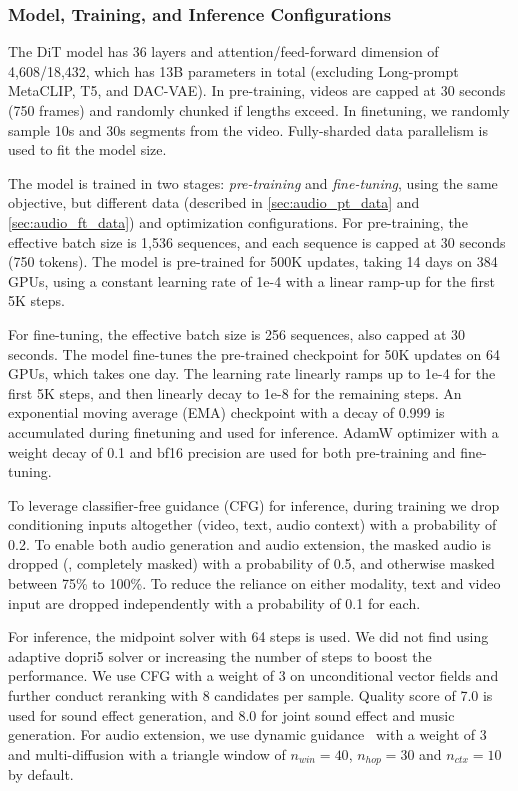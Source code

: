 \subsubsection{Model, Training, and Inference Configurations}
The DiT model has 36 layers and attention/feed-forward dimension of 4,608/18,432,
which has 13B parameters in total (excluding Long-prompt MetaCLIP, T5, and DAC-VAE).
In pre-training, videos are capped at 30 seconds (750 frames) and randomly chunked if lengths exceed.
In finetuning, we randomly sample 10s and 30s segments from the video.
Fully-sharded data parallelism is used to fit the model size.

The model is trained in two stages: \textit{pre-training} and \textit{fine-tuning}, using the same objective, but different data (described in \cref{sec:audio_pt_data} and \cref{sec:audio_ft_data}) and optimization configurations.
For pre-training, the effective batch size is 1,536 sequences, and each sequence is capped at 30 seconds (750 tokens).
The model is pre-trained for 500K updates, taking 14 days on 384 GPUs, using a constant learning rate of 1e-4 with a linear ramp-up for the first 5K steps.

For fine-tuning, the effective batch size is 256 sequences, also capped at 30 seconds.
The model fine-tunes the pre-trained checkpoint for 50K updates on 64 GPUs, which takes one day.
The learning rate linearly ramps up to 1e-4 for the first 5K steps, and then linearly decay to 1e-8 for the remaining steps.
An exponential moving average (EMA) checkpoint with a decay of 0.999 is accumulated during finetuning and used for inference.
AdamW optimizer with a weight decay of 0.1 and bf16 precision are used for both pre-training and fine-tuning.

To leverage classifier-free guidance (CFG) for inference, during training we drop conditioning inputs altogether (video, text, audio context) with a probability of 0.2.
To enable both audio generation and audio extension, the masked audio is dropped (\ie, completely masked) with a probability of 0.5, and otherwise masked between 75\% to 100\%.
To reduce the reliance on either modality, text and video input are dropped independently with a probability of 0.1 for each.

For inference, the midpoint solver with 64 steps is used.
We did not find using adaptive dopri5 solver or increasing the number of steps to boost the performance.
We use CFG with a weight of 3 on unconditional vector fields and further conduct reranking with 8 candidates per sample.
Quality score of 7.0 is used for sound effect generation, and 8.0 for joint sound effect and music generation.
For audio extension, we use dynamic guidance~\citep{wang2024analysisclassifierfreeguidanceweight} with a weight of 3 and multi-diffusion with a triangle window of $n_{win} = 40$, $n_{hop} = 30$ and $n_{ctx} = 10$ by default.
